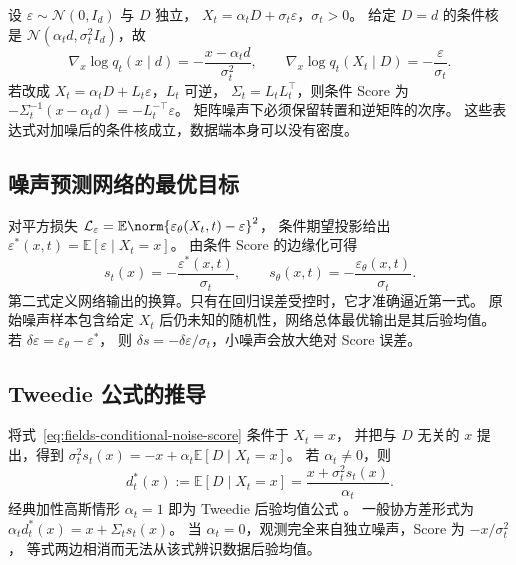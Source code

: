 设 \(\varepsilon\sim\mathcal N(0,I_d)\) 与 \(D\) 独立，
\(X_t=\alpha_tD+\sigma_t\varepsilon\)，\(\sigma_t>0\)。
给定 \(D=d\) 的条件核是 \(\mathcal N(\alpha_td,\sigma_t^2I_d)\)，故
\begin{equation}
 \nabla_x\log q_t(x\mid d)
 =-\frac{x-\alpha_td}{\sigma_t^2},\qquad
 \nabla_x\log q_t(X_t\mid D)=-\frac{\varepsilon}{\sigma_t}.
 \label{eq:fields-conditional-noise-score}
\end{equation}
若改成 \(X_t=\alpha_tD+L_t\varepsilon\)，\(L_t\) 可逆，
\(\Sigma_t=L_tL_t^\top\)，则条件 Score 为
\(-\Sigma_t^{-1}(x-\alpha_td)=-L_t^{-\top}\varepsilon\)。
矩阵噪声下必须保留转置和逆矩阵的次序。
这些表达式对加噪后的条件核成立，数据端本身可以没有密度。

\subsection{噪声预测网络的最优目标}

对平方损失 \(\mathcal L_\varepsilon=\mathbb E\norm{\varepsilon_\theta(X_t,t)-\varepsilon}^2\)，
条件期望投影给出 \(\varepsilon^*(x,t)=\mathbb E[\varepsilon\mid X_t=x]\)。
由条件 Score 的边缘化可得
\begin{equation}
 s_t(x)=-\frac{\varepsilon^*(x,t)}{\sigma_t},\qquad
 s_\theta(x,t)=-\frac{\varepsilon_\theta(x,t)}{\sigma_t}.
 \label{eq:fields-noise-to-score}
\end{equation}
第二式定义网络输出的换算。只有在回归误差受控时，它才准确逼近第一式。
原始噪声样本包含给定 \(X_t\) 后仍未知的随机性，网络总体最优输出是其后验均值。
若 \(\delta\varepsilon=\varepsilon_\theta-\varepsilon^*\)，
则 \(\delta s=-\delta\varepsilon/\sigma_t\)，小噪声会放大绝对 Score 误差。

\subsection{Tweedie 公式的推导\requiredderivation}
\label{subsec:tweedie}

将式~\eqref{eq:fields-conditional-noise-score} 条件于 \(X_t=x\)，
并把与 \(D\) 无关的 \(x\) 提出，得到
\(\sigma_t^2s_t(x)=-x+\alpha_t\mathbb E[D\mid X_t=x]\)。
若 \(\alpha_t\ne0\)，则
\begin{equation}
 d_t^*(x):=\mathbb E[D\mid X_t=x]
       =\frac{x+\sigma_t^2s_t(x)}{\alpha_t}.
 \label{eq:fields-tweedie}
\end{equation}
经典加性高斯情形 \(\alpha_t=1\) 即为 Tweedie 后验均值公式 \cite{efron2011tweedie}。
一般协方差形式为
\(\alpha_t d_t^*(x)=x+\Sigma_t s_t(x)\)。
当 \(\alpha_t=0\)，观测完全来自独立噪声，Score 为 \(-x/\sigma_t^2\)，
等式两边相消而无法从该式辨识数据后验均值。

